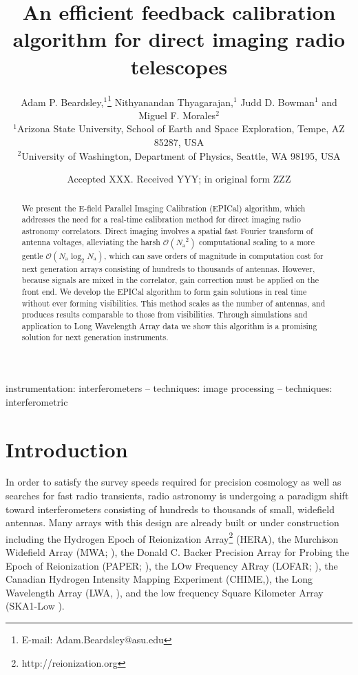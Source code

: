 \documentclass[a4paper,fleqn,usenatbib]{../mnras}
\title[EPICal]{An efficient feedback calibration algorithm for direct imaging radio telescopes
}
\author[Beardsley et al.]{
Adam P. Beardsley,$^{1}$\thanks{E-mail: Adam.Beardsley@asu.edu}
Nithyanandan Thyagarajan,$^{1}$
Judd D. Bowman$^{1}$
\newauthor
and Miguel F. Morales$^{2}$
\\
$^{1}$Arizona State University, School of Earth and Space Exploration, Tempe, AZ 85287, USA\\
$^{2}$University of Washington, Department of Physics, Seattle, WA 98195, USA\\
}
\date{Accepted XXX. Received YYY; in original form ZZZ}
\newcommand{\Nant}{\ensuremath{N_{\mathrm{a}}}}
\begin{document}
\label{firstpage}
\pagerange{\pageref{firstpage}--\pageref{lastpage}}
\maketitle

\begin{abstract}
We present the E-field Parallel Imaging Calibration (EPICal) algorithm, which addresses the need for a real-time calibration method for direct imaging radio astronomy correlators. Direct imaging involves a spatial fast Fourier transform of antenna voltages, alleviating the harsh $\mathcal{O}(\Nant^2)$ computational scaling to a more gentle $\mathcal{O}(\Nant \log_2 \Nant)$, which can save orders of magnitude in computation cost for next generation arrays consisting of hundreds to thousands of antennas. However, because signals are mixed in the correlator, gain correction must be applied on the front end. We develop the EPICal algorithm to form gain solutions in real time without ever forming visibilities. This method scales as the number of antennas, and produces results comparable to those from visibilities. Through simulations and application to Long Wavelength Array data we show this algorithm is a promising solution for next generation instruments.
\end{abstract}

\begin{keywords}
instrumentation: interferometers -- techniques: image processing -- techniques: interferometric
\end{keywords}



\section{Introduction}
In order to satisfy the survey speeds required for precision cosmology as well as searches for fast radio transients, radio astronomy is undergoing a paradigm shift toward interferometers consisting of hundreds to thousands of small, widefield antennas. Many arrays with this design are already built or under construction including the Hydrogen Epoch of Reionization Array\footnote{http://reionization.org} (HERA), the Murchison Widefield Array (MWA; \citealt{tin13,bow13}), the Donald C. Backer Precision Array for Probing the Epoch of Reionization (PAPER; \citealt{par10}), the LOw Frequency ARray (LOFAR; \citealt{van13}), the Canadian Hydrogen Intensity Mapping Experiment (CHIME,\citealt{ban14}), the Long Wavelength Array (LWA, \citealt{ell13}), and the low frequency Square Kilometer Array (SKA1-Low \citealt{mel13}).
\end{document}
